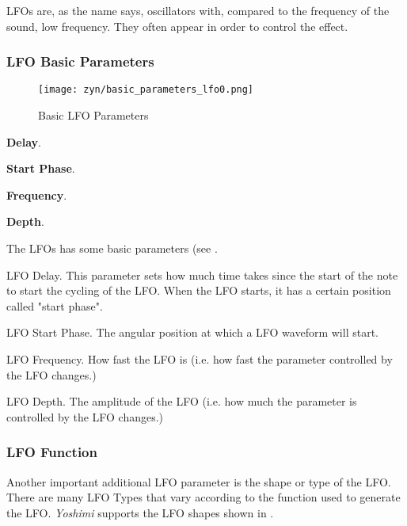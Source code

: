    LFOs are, as the name says, oscillators with, compared to the frequency of
   the sound, low frequency. They often appear in order to control the
   effect.

\subsubsection{LFO Basic Parameters}
\label{subsubsec:lfo_basic_parameters}

\begin{figure}[H]
   \centering 
   \texttt{[image: zyn/basic\_parameters\_lfo0.png]}
   \caption[Basic LFO Parameters]{Basic LFO Parameters}
   \label{fig:basic_parameters_lfo} 
\end{figure}

   \begin{enumber}
      \item \textbf{Delay}.
      \item \textbf{Start Phase}.
      \item \textbf{Frequency}.
      \item \textbf{Depth}.
   \end{enumber}

   The LFOs has some basic parameters (see
   .

   \setcounter{ItemCounter}{0}      %

   LFO Delay.
   This parameter sets how much time takes since the start of the note to
   start the cycling of the LFO.
   When the LFO starts, it has a certain position called "start phase".

   LFO Start Phase.
   The angular position at which a LFO waveform will start.

   LFO Frequency.
   How fast the LFO is (i.e. how fast the parameter controlled by
   the LFO changes.)

   LFO Depth.
   The amplitude of the LFO (i.e. how much the parameter is controlled by
   the LFO changes.)

\subsubsection{LFO Function}
\label{subsubsec:lfo_function}

   Another important additional LFO parameter is the shape or type of the
   LFO. There are many LFO Types that vary according to the function used to
   generate the LFO. \textsl{Yoshimi} supports the LFO shapes shown in
   .

